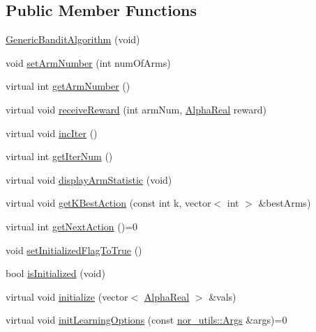 \subsection*{Public Member Functions}
\begin{DoxyCompactItemize}
\item 
\hyperlink{classMultiBoost_1_1GenericBanditAlgorithm_a0bf7506e5e8f34bf3dfde986f3c85175}{Generic\-Bandit\-Algorithm} (void)
\item 
void \hyperlink{classMultiBoost_1_1GenericBanditAlgorithm_a08d2a723be031cc00834c2100482dc84}{set\-Arm\-Number} (int num\-Of\-Arms)
\item 
virtual int \hyperlink{classMultiBoost_1_1GenericBanditAlgorithm_ac3df186feaceaafaf2b2f2b46978b8ea}{get\-Arm\-Number} ()
\item 
virtual void \hyperlink{classMultiBoost_1_1GenericBanditAlgorithm_affd61d12f8dc47d4ad45721562ba60b7}{receive\-Reward} (int arm\-Num, \hyperlink{Defaults_8h_a80184c4fd10ab70a1a17c5f97dcd1563}{Alpha\-Real} reward)
\item 
virtual void \hyperlink{classMultiBoost_1_1GenericBanditAlgorithm_a330c48a449634e59b7b7048ce92a0e87}{inc\-Iter} ()
\item 
virtual int \hyperlink{classMultiBoost_1_1GenericBanditAlgorithm_aa80c4fcb190261b6fac018a4777ea2f3}{get\-Iter\-Num} ()
\item 
virtual void \hyperlink{classMultiBoost_1_1GenericBanditAlgorithm_a178e726dabe5697d67e8b27da846c80e}{display\-Arm\-Statistic} (void)
\item 
virtual void \hyperlink{classMultiBoost_1_1GenericBanditAlgorithm_aba6a5d2e4462644f15df846305783c15}{get\-K\-Best\-Action} (const int k, vector$<$ int $>$ \&best\-Arms)
\item 
virtual int \hyperlink{classMultiBoost_1_1GenericBanditAlgorithm_a73d90995d4694aa23649dc508527cc8c}{get\-Next\-Action} ()=0
\item 
void \hyperlink{classMultiBoost_1_1GenericBanditAlgorithm_a46b30a6f1183410862a3ace8068b728d}{set\-Initialized\-Flag\-To\-True} ()
\item 
bool \hyperlink{classMultiBoost_1_1GenericBanditAlgorithm_a4745536d9d3197d78010bf83b0004402}{is\-Initialized} (void)
\item 
virtual void \hyperlink{classMultiBoost_1_1GenericBanditAlgorithm_a21bb0d3dc368c96135c387783315cc4f}{initialize} (vector$<$ \hyperlink{Defaults_8h_a80184c4fd10ab70a1a17c5f97dcd1563}{Alpha\-Real} $>$ \&vals)
\item 
virtual void \hyperlink{classMultiBoost_1_1GenericBanditAlgorithm_a61b051648cee17985a8a8bc0332e8bb9}{init\-Learning\-Options} (const \hyperlink{classnor__utils_1_1Args}{nor\-\_\-utils\-::\-Args} \&args)=0
\end{DoxyCompactItemize}
